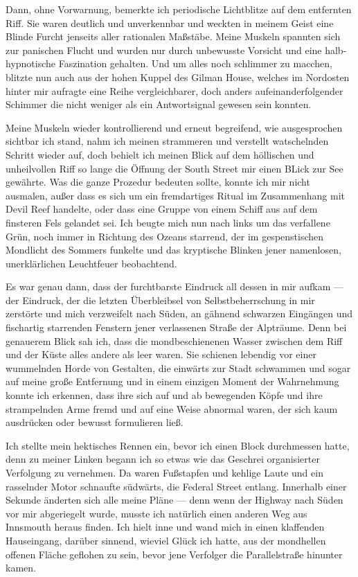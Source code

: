 Dann, ohne Vorwarnung, bemerkte ich periodische Lichtblitze auf dem entfernten Riff. Sie waren deutlich und unverkennbar und weckten in meinem Geist eine Blinde Furcht jenseits aller rationalen Maßstäbe. Meine Muskeln spannten sich zur panischen Flucht und wurden nur durch unbewusste Vorsicht und eine halb-hypnotische Faszination gehalten. Und um alles noch schlimmer zu macchen, blitzte nun auch aus der hohen Kuppel des Gilman House, welches im Nordosten hinter mir aufragte eine Reihe vergleichbarer, doch anders aufeinanderfolgender Schimmer die nicht weniger als ein Antwortsignal gewesen sein konnten.

Meine Muskeln wieder kontrollierend und erneut begreifend, wie ausgesprochen sichtbar ich stand, nahm ich meinen strammeren und verstellt watschelnden Schritt wieder auf, doch behielt ich meinen Blick auf dem höllischen und unheilvollen Riff so lange die Öffnung der South Street mir einen BLick zur See gewährte. Was die ganze Prozedur bedeuten sollte, konnte ich mir nicht ausmalen, außer dass es sich um ein fremdartiges Ritual im Zusammenhang mit Devil Reef handelte, oder dass eine Gruppe von einem Schiff aus auf dem finsteren Fels gelandet sei. Ich beugte mich nun nach links um das verfallene Grün, noch immer in Richtung des Ozeans starrend, der im gespenstischen Mondlicht des Sommers funkelte und das kryptische Blinken jener namenlosen, unerklärlichen Leuchtfeuer beobachtend.

Es war genau dann, dass der furchtbarste Eindruck all dessen in mir aufkam --- der Eindruck, der die letzten Überbleibsel von Selbstbeherrschung in mir zerstörte und mich verzweifelt nach Süden, an gähnend schwarzen Eingängen und fischartig starrenden Fenstern jener verlassenen Straße der Alpträume. Denn bei genauerem Blick sah ich, dass die mondbeschienenen Wasser zwischen dem Riff und der Küste alles andere als leer waren. Sie schienen lebendig vor einer wummelnden Horde von Gestalten, die einwärts zur Stadt schwammen und sogar auf meine große Entfernung und in einem einzigen Moment der Wahrnehmung konnte ich erkennen, dass ihre sich auf und ab bewegenden Köpfe und ihre strampelnden Arme fremd und auf eine Weise abnormal waren, der sich kaum ausdrücken oder bewusst formulieren ließ.

Ich stellte mein hektisches Rennen ein, bevor ich einen Block durchmessen hatte, denn zu meiner Linken begann ich so etwas wie das Geschrei organisierter Verfolgung zu vernehmen. Da waren Fußstapfen und kehlige Laute und ein rasselnder Motor schnaufte südwärts, die Federal Street entlang. Innerhalb einer Sekunde änderten sich alle meine Pläne --- denn wenn der Highway nach Süden vor mir abgeriegelt wurde, musste ich natürlich einen anderen Weg aus Innsmouth heraus finden. Ich hielt inne und wand mich in einen klaffenden Hauseingang, darüber sinnend, wieviel Glück ich hatte, aus der mondhellen offenen Fläche geflohen zu sein, bevor jene Verfolger die Parallelstraße hinunter kamen.

